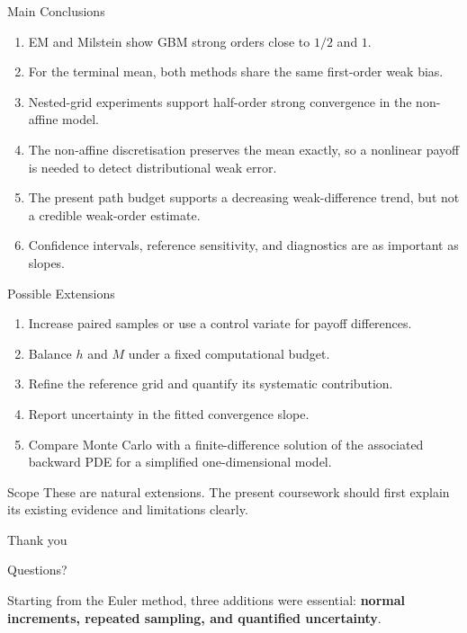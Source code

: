 \documentclass[aspectratio=169,10pt]{beamer}
\begin{document}
\begin{frame}{Main Conclusions}
  \begin{enumerate}
    \item EM and Milstein show GBM strong orders close to $1/2$ and $1$.
    \item For the terminal mean, both methods share the same first-order weak bias.
    \item Nested-grid experiments support half-order strong convergence in the non-affine model.
    \item The non-affine discretisation preserves the mean exactly, so a nonlinear
      payoff is needed to detect distributional weak error.
    \item The present path budget supports a decreasing weak-difference trend,
      but not a credible weak-order estimate.
    \item Confidence intervals, reference sensitivity, and diagnostics are as important as slopes.
  \end{enumerate}
\end{frame}

\begin{frame}{Possible Extensions}
  \begin{enumerate}
    \item Increase paired samples or use a control variate for payoff differences.
    \item Balance $h$ and $M$ under a fixed computational budget.
    \item Refine the reference grid and quantify its systematic contribution.
    \item Report uncertainty in the fitted convergence slope.
    \item Compare Monte Carlo with a finite-difference solution of the associated
      backward PDE for a simplified one-dimensional model.
  \end{enumerate}
  \begin{block}{Scope}
    These are natural extensions. The present coursework should first explain
    its existing evidence and limitations clearly.
  \end{block}
\end{frame}

\begin{frame}[plain]
  \vfill
  \centering
  {\Huge\color{CourseNavy}Thank you}

  \vspace{1em}
  {\Large Questions?}

  \vspace{2em}
  \begin{minipage}{0.78\textwidth}
    \centering
    \color{CourseTeal}
    Starting from the Euler method, three additions were essential:
    \textbf{normal increments, repeated sampling, and quantified uncertainty}.
  \end{minipage}
  \vfill
\end{frame}
\end{document}
